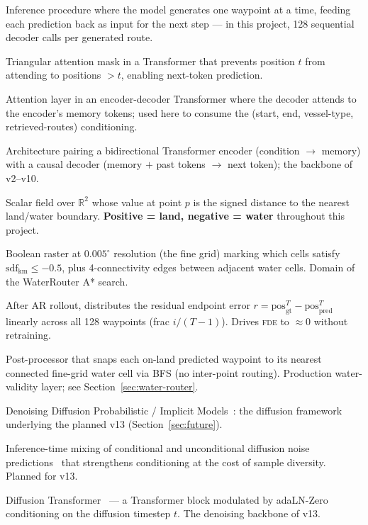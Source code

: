 \documentclass[11pt,a4paper]{article}
\newcommand{\fde}{\textsc{fde}}
\begin{document}
\begin{description}
Inference procedure where the model generates one waypoint at a time,
feeding each prediction back as input for the next step --- in this
project, 128 sequential decoder calls per generated route.
\item[\textbf{Causal mask}]
Triangular attention mask in a Transformer that prevents position $t$
from attending to positions $> t$, enabling next-token prediction.
\item[\textbf{Cross-attention}]
Attention layer in an encoder-decoder Transformer where the decoder
attends to the encoder's memory tokens; used here to consume the
(start, end, vessel-type, retrieved-routes) conditioning.
\item[\textbf{Encoder-decoder Transformer}]
Architecture pairing a bidirectional Transformer encoder
(condition $\to$ memory) with a causal decoder
(memory $+$ past tokens $\to$ next token); the backbone of v2--v10.
\item[\textbf{Signed-distance field (SDF)}]
Scalar field over $\mathbb{R}^2$ whose value at point $p$ is the signed
distance to the nearest land/water boundary.
\textbf{Positive = land, negative = water} throughout this project.
\item[\textbf{Water-cell graph}]
Boolean raster at $0.005^\circ$ resolution (the fine grid)
marking which cells satisfy $\text{sdf}_\text{km} \le -0.5$,
plus 4-connectivity edges between adjacent water cells.
Domain of the WaterRouter A* search.
\item[\textbf{Linear endpoint correction}]
After AR rollout, distributes the residual endpoint error
$r = \text{pos}^T_\text{gt} - \text{pos}^T_\text{pred}$ linearly across
all 128 waypoints (frac $i/(T-1)$). Drives \fde{} to $\approx 0$
without retraining.
\item[\textbf{WaterRouter snap-only}]
Post-processor that snaps each on-land predicted waypoint to its
nearest connected fine-grid water cell via BFS (no inter-point routing).
Production water-validity layer; see Section~\ref{sec:water-router}.
\item[\textbf{DDPM / DDIM}]
Denoising Diffusion Probabilistic / Implicit Models~\cite{ho2020denoising,song2021ddim}:
the diffusion framework underlying the planned v13 (Section~\ref{sec:future}).
\item[\textbf{Classifier-free guidance (CFG)}]
Inference-time mixing of conditional and unconditional diffusion noise
predictions~\cite{ho2022classifier} that strengthens conditioning at
the cost of sample diversity. Planned for v13.
\item[\textbf{DiT}]
Diffusion Transformer~\cite{peebles2023dit} --- a Transformer block
modulated by adaLN-Zero conditioning on the diffusion timestep $t$.
The denoising backbone of v13.
\end{description}
\end{document}
